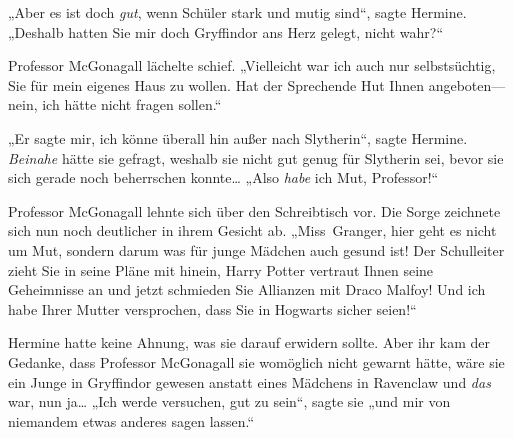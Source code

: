 „Aber es ist doch \emph{gut}, wenn Schüler stark und mutig sind“, sagte Hermine.
„Deshalb hatten Sie mir doch Gryffindor ans Herz gelegt, nicht wahr?“

Professor McGonagall lächelte schief.
„Vielleicht war ich auch nur selbstsüchtig, Sie für mein eigenes Haus zu wollen. Hat der Sprechende Hut Ihnen angeboten—nein, ich hätte nicht fragen sollen.“

„Er sagte mir, ich könne überall hin außer nach Slytherin“, sagte Hermine. \emph{Beinahe} hätte sie gefragt, weshalb sie nicht gut genug für Slytherin sei, bevor sie sich gerade noch beherrschen konnte…
„Also \emph{habe} ich Mut, Professor!“

Professor McGonagall lehnte sich über den Schreibtisch vor. Die Sorge zeichnete sich nun noch deutlicher in ihrem Gesicht ab.
„Miss~Granger, hier geht es nicht um Mut, sondern darum was für junge Mädchen auch gesund ist! Der Schulleiter zieht Sie in seine Pläne mit hinein, Harry Potter vertraut Ihnen seine Geheimnisse an und jetzt schmieden Sie Allianzen mit Draco Malfoy! Und ich habe Ihrer Mutter versprochen, dass Sie in Hogwarts sicher seien!“

Hermine hatte keine Ahnung, was sie darauf erwidern sollte. Aber ihr kam der Gedanke, dass Professor McGonagall sie womöglich nicht gewarnt hätte, wäre sie ein Junge in Gryffindor gewesen anstatt eines Mädchens in Ravenclaw und \emph{das} war, nun ja…
„Ich werde versuchen, gut zu sein“, sagte sie „und mir von niemandem etwas anderes sagen lassen.“


